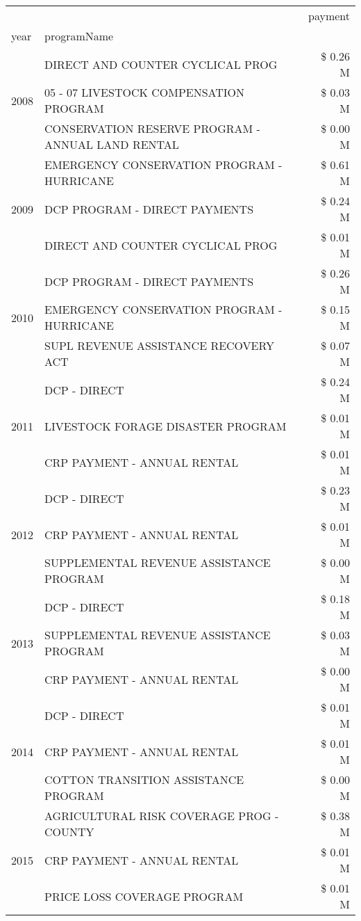 \begin{tabular}{llr}
\toprule
 &  & payment \\
year & programName &  \\
\midrule
\multirow[t]{3}{*}{2008} & DIRECT AND COUNTER CYCLICAL PROG & \$ 0.26 M \\
 & 05 - 07 LIVESTOCK COMPENSATION PROGRAM & \$ 0.03 M \\
 & CONSERVATION RESERVE PROGRAM - ANNUAL LAND RENTAL & \$ 0.00 M \\
\cline{1-3}
\multirow[t]{3}{*}{2009} & EMERGENCY CONSERVATION PROGRAM - HURRICANE & \$ 0.61 M \\
 & DCP PROGRAM - DIRECT PAYMENTS & \$ 0.24 M \\
 & DIRECT AND COUNTER CYCLICAL PROG & \$ 0.01 M \\
\cline{1-3}
\multirow[t]{3}{*}{2010} & DCP PROGRAM - DIRECT PAYMENTS & \$ 0.26 M \\
 & EMERGENCY CONSERVATION PROGRAM - HURRICANE & \$ 0.15 M \\
 & SUPL REVENUE ASSISTANCE RECOVERY ACT & \$ 0.07 M \\
\cline{1-3}
\multirow[t]{3}{*}{2011} & DCP - DIRECT & \$ 0.24 M \\
 & LIVESTOCK FORAGE DISASTER PROGRAM & \$ 0.01 M \\
 & CRP PAYMENT - ANNUAL RENTAL & \$ 0.01 M \\
\cline{1-3}
\multirow[t]{3}{*}{2012} & DCP - DIRECT & \$ 0.23 M \\
 & CRP PAYMENT - ANNUAL RENTAL & \$ 0.01 M \\
 & SUPPLEMENTAL REVENUE ASSISTANCE PROGRAM & \$ 0.00 M \\
\cline{1-3}
\multirow[t]{3}{*}{2013} & DCP - DIRECT & \$ 0.18 M \\
 & SUPPLEMENTAL REVENUE ASSISTANCE PROGRAM & \$ 0.03 M \\
 & CRP PAYMENT - ANNUAL RENTAL & \$ 0.00 M \\
\cline{1-3}
\multirow[t]{3}{*}{2014} & DCP - DIRECT & \$ 0.01 M \\
 & CRP PAYMENT - ANNUAL RENTAL & \$ 0.01 M \\
 & COTTON TRANSITION ASSISTANCE PROGRAM & \$ 0.00 M \\
\cline{1-3}
\multirow[t]{3}{*}{2015} & AGRICULTURAL RISK COVERAGE PROG - COUNTY & \$ 0.38 M \\
 & CRP PAYMENT - ANNUAL RENTAL & \$ 0.01 M \\
 & PRICE LOSS COVERAGE PROGRAM & \$ 0.01 M \\

\end{tabular}
